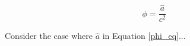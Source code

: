 \documentclass{article}
\begin{document}
\fontsize{40}{50}\selectfont 

\begin{equation} 
\label{phi_eq}
\phi = \frac{\hat{a}}{c^2}
\end{equation}

Consider the case where 
$\hat{a}$ in Equation 
\ref{phi_eq}...
\end{document}
